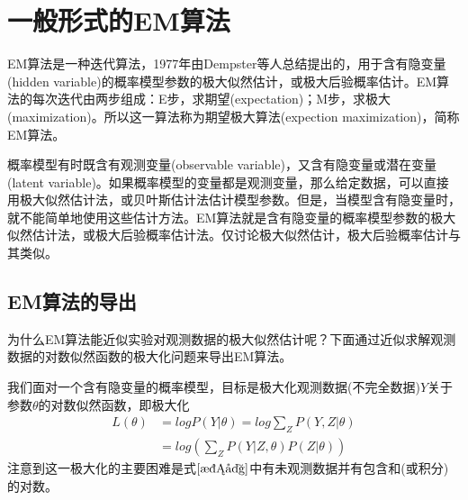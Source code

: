 \section{一般形式的EM算法}
EM算法是一种迭代算法，1977年由Dempster等人总结提出的，用于含有隐变量(hidden variable)的概率模型参数的极大似然估计，或极大后验概率估计。EM算法的每次迭代由两步组成：E步，求期望(expectation)；M步，求极大(maximization)。所以这一算法称为期望极大算法(expection maximization)，简称EM算法。

概率模型有时既含有观测变量(observable variable)，又含有隐变量或潜在变量(latent variable)。如果概率模型的变量都是观测变量，那么给定数据，可以直接用极大似然估计法，或贝叶斯估计法估计模型参数。但是，当模型含有隐变量时，就不能简单地使用这些估计方法。EM算法就是含有隐变量的概率模型参数的极大似然估计法，或极大后验概率估计法。仅讨论极大似然估计，极大后验概率估计与其类似。

\subsection*{EM算法的导出}
为什么EM算法能近似实验对观测数据的极大似然估计呢？下面通过近似求解观测数据的对数似然函数的极大化问题来导出EM算法。

我们面对一个含有隐变量的概率模型，目标是极大化观测数据(不完全数据)$Y$关于参数$\theta$的对数似然函数，即极大化
\begin{equation}
\label{极大}
	\begin{aligned}
		L(\theta)&=log P(Y|\theta) =log \sum_{Z}P(Y,Z|\theta) \\
		&=log\left(\sum_{Z}P(Y|Z,\theta)P(Z|\theta)\right)
	\end{aligned}
\end{equation}
注意到这一极大化的主要困难是式$\ref{极大}$中有未观测数据并有包含和(或积分)的对数。

